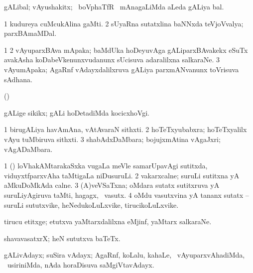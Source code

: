 {{{{{{\bentry
{}
 \gl{\nA}
\bmng
{} 
\emng
\eentry

\bentry
{} 
\gl{\nA}
\expl{}
\bmng
gALibal; vAyushakitx; \kanmu\ boVphaTfR \mo\ mAnagaLiMda aLeda gALiya bal. 
\emng
\eentry

\bentry
{}
  \gl{\nA}\bmng
\bnum
\num{1} kudureya cuMcukAlina gaMti. 
\num{2} sUyaRna sutatxlina baNNxda teVjoVvalya; parxBAmaMDal. 
\enum
\emng
\eentry

\bentry
{}
  \gl{\nA}\bmng
\bnum
\num{1}  
\num{2} vAyuparxBAva mApaka; baMdUka hoDeyuvAga gALiparxBAvakekx eSuTx avakAsha koDabeVkenunxvudanunx sUcisuva adaralilxna salkaraNe. 
\num{3} vAyumApaka; AgaRnf vAdayxdalilxruva gALiya parxmANvanunx toVrisuva sAdhana. 
\enum
\emng
\eentry

\bentry
{}
  \gl{\nA}\bmng
(\birx)  
\emng
\eentry

\bentry
{}
  \gl{\kirxvi}\bmng
gALige sikikx; gALi hoDetadiMda kocicxhoVgi. 
\emng
\eentry

\bentry
{}
  \gl{\nA}\bmng
\bnum
\num{1} birugALiya havAmAna, vAtAvaraN sithxti. 
\num{2} hoTeTxyubabxra; hoTeTxyalilx vAyu tuMbiruva sithxti. 
\num{3} shabAdxDaMbara; bojujxmAtina vAgaJxri; vAgADaMbara. 
\enum
\emng
\eentry

\bentry
{}
  \gl{\nA}\bmng
\bnum
\num{1} (\viduyx) \eng{[} loVhakAMtarakaSxka  \mo vugaLa meVle samarUpavAgi sutitxda, viduyxtfparxvAha taMtigaLa\eng{]} niDusuruLi. 
\num{2} vakarxcalne; suruLi sutitxna yA aMkuDoMkAda calne. 
\num{3} (A)veVSaTxna; oMdara sutatx sutitxruva yA suruLiyAgiruva taMti, hagagx, \mo\ vasutx. 
\num{4} oMdu vasutxvina yA tananx sutatx -- suruLi sututxvike, heNedukoLuLxvike, tirucikoLuLxvike. 
\enum
\emng
\eentry

\bentry
{}
  \gl{\nA}\bmng
tirucu etitxge; etutxva yaMtarxdalilxna eMjinf, yaMtarx salkaraNe. 
\emng
\eentry

\bentry
{}
  \gl{\nA}\bmng
shavavasatxrX; heN sututxva baTeTx. 
\emng
\eentry

\bentry
{}
 \gl{\nA}\bmng
gALivAdayx; suSira vAdayx; AgaRnf, koLalu, kahaLe, \mo\ vAyuparxvAhadiMda, \kanmu\ usiriniMda, nAda horaDisuva saMgiVtavAdayx. 
\emng
\eentry

}}}}}}
